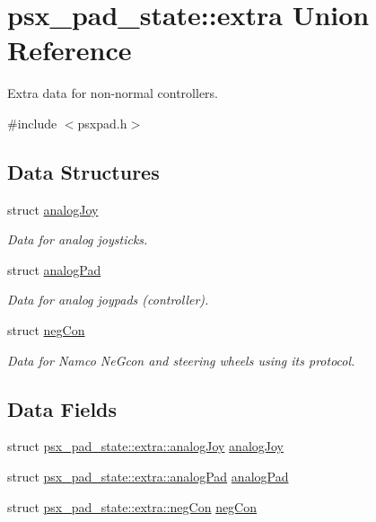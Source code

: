 \hypertarget{unionpsx__pad__state_1_1extra}{}\section{psx\+\_\+pad\+\_\+state\+:\+:extra Union Reference}
\label{unionpsx__pad__state_1_1extra}


Extra data for non-\/normal controllers.  




{\ttfamily \#include $<$psxpad.\+h$>$}

\subsection*{Data Structures}
\begin{DoxyCompactItemize}
\item 
struct \hyperlink{structpsx__pad__state_1_1extra_1_1analogJoy}{analog\+Joy}
\begin{DoxyCompactList}\small\item\em Data for analog joysticks. \end{DoxyCompactList}\item 
struct \hyperlink{structpsx__pad__state_1_1extra_1_1analogPad}{analog\+Pad}
\begin{DoxyCompactList}\small\item\em Data for analog joypads (controller). \end{DoxyCompactList}\item 
struct \hyperlink{structpsx__pad__state_1_1extra_1_1negCon}{neg\+Con}
\begin{DoxyCompactList}\small\item\em Data for Namco Ne\+Gcon and steering wheels using its protocol. \end{DoxyCompactList}\end{DoxyCompactItemize}
\subsection*{Data Fields}
\begin{DoxyCompactItemize}
\item 
struct \hyperlink{structpsx__pad__state_1_1extra_1_1analogJoy}{psx\+\_\+pad\+\_\+state\+::extra\+::analog\+Joy} \hyperlink{unionpsx__pad__state_1_1extra_a371441709cf4b2cde155a14098f31d78}{analog\+Joy}
\item 
struct \hyperlink{structpsx__pad__state_1_1extra_1_1analogPad}{psx\+\_\+pad\+\_\+state\+::extra\+::analog\+Pad} \hyperlink{unionpsx__pad__state_1_1extra_a695297f806918f29e75ce3b60b8a023c}{analog\+Pad}
\item 
struct \hyperlink{structpsx__pad__state_1_1extra_1_1negCon}{psx\+\_\+pad\+\_\+state\+::extra\+::neg\+Con} \hyperlink{unionpsx__pad__state_1_1extra_add4e14f1a60c319b3db982fc94fa0bba}{neg\+Con}
\end{DoxyCompactItemize}


